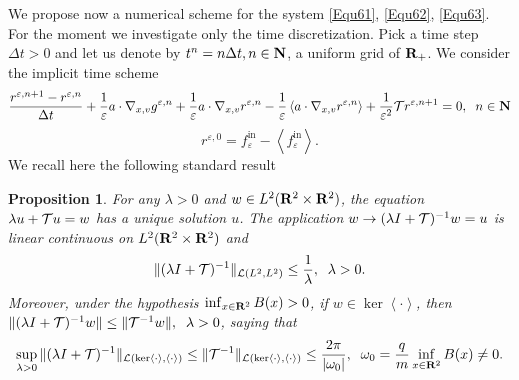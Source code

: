 \documentclass[12pt, a4paper]{article}
\newcommand{\red}{\textcolor{red!95!black}}
\providecommand\mathbb{\bf}
\newcommand\R{{\mathbb R}}
\newcommand\N{{\mathbb N}}
\newtheorem{pro}{Proposition}[section]
\newcommand{\eps}[0]{
\varepsilon}
\newcommand{\rez}[0]{
r ^{\varepsilon, 0}}
\newcommand{\ren}[0]{
r ^{\varepsilon, n}}
\newcommand{\renpo}[0]{
r ^{\varepsilon, n + 1}}
\newcommand{\gen}[0]{
g ^{\varepsilon, n}}
\newcommand{\fine}[0]{
f ^{\mathrm{in}}_{\varepsilon}}
\newcommand{\ltxv}[0]{
L^2(\R ^2 \times \R ^2)}
\newcommand{\nxv}[0]{
\nabla_{x,v}}
\newcommand{\ave}[1]{
\left \langle #1 \right \rangle }
\begin{document}
We propose now a numerical scheme for the system \eqref{Equ61}, \eqref{Equ62}, \eqref{Equ63}. For the moment we investigate only the time discretization. Pick a time step $\Delta t >0$ and let us denote by $t ^n = n \Delta t, n \in \N$, a uniform grid of $\R_+$. We consider the implicit time scheme
\begin{equation}
\label{Equ65} \frac{\renpo - \ren}{\Delta t} + \frac{1}{\eps} a \cdot \nxv \gen + \frac{1}{\eps} a \cdot \nxv \ren - \frac{1}{\eps} \ave{ a \cdot \nxv \ren } + \frac{1}{\eps ^2} {\cal T} \renpo = 0,\;\;n \in \N
\end{equation}
\begin{equation}
\label{Equ66} \rez = \fine - \ave{\fine}.
\end{equation}
We recall here the following standard result
\begin{pro}
\label{UnifInv} For any $\lambda >0$ and $w \in \ltxv{}$, the equation $\lambda u + {\cal T} u = w$ has a unique solution $u$. The application $w \to (\lambda I + {\cal T})^{-1} w = u$ is linear continuous on $\ltxv{}$ and
\[
\| (\lambda I + {\cal T})^{-1}  \|_{{\cal L} (L^2, L^2)} \leq \frac{1}{\lambda},\;\;\lambda >0.
\] 
\red{Moreover, under the hypothesis $\inf _{x \in \R^2} B(x) >0$, if $w \in \ker \ave{\cdot}$, then $\|(\lambda I + {\cal T} ) ^{-1} w \| \leq \|{\cal T} ^{-1} w\|,\;\;\lambda >0$, saying that 
\[
\sup _{\lambda >0} \| (\lambda I + {\cal T} ) ^{-1}\|_{{\cal L} ( \ker \ave{\cdot}, \ave{\cdot})} \leq \|{\cal T}^{-1} \|_{{\cal L} ( \ker \ave{\cdot}, \ave{\cdot})} \leq \frac{2\pi}{|\omega _0|},\;\;\omega _0 = \frac{q}{m} \inf _{x \in \R^2} B(x) \neq 0.
\]
}
\end{pro}
\end{document}
